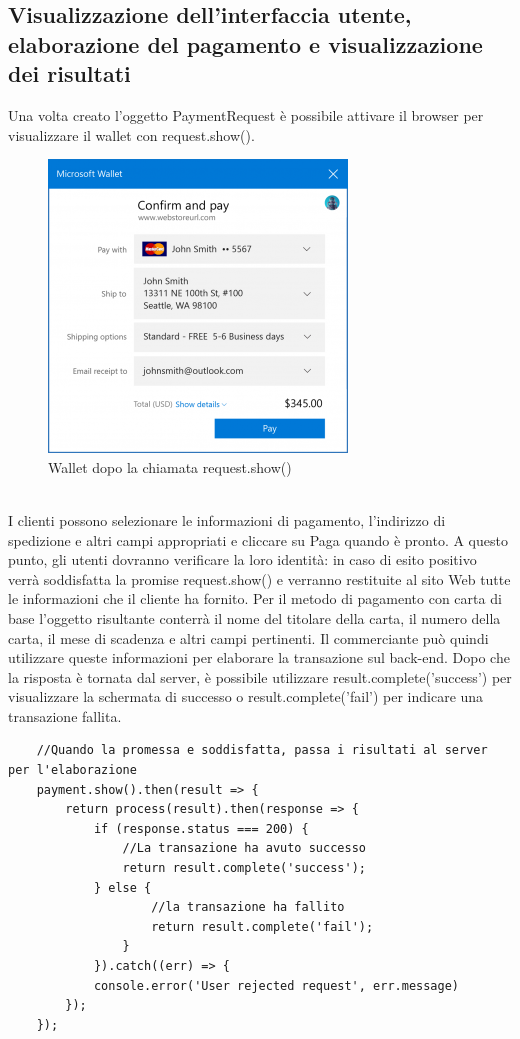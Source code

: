 \documentclass[11pt ,a4paper , twoside , openright ]{article}
\begin{document}
	\subsection{Visualizzazione dell'interfaccia utente, elaborazione del pagamento e visualizzazione dei risultati}
	Una volta creato l'oggetto PaymentRequest è possibile attivare il browser per visualizzare il wallet con request.show(). 
	\begin{figure}[h]
		\centering
		\includegraphics[width=0.5\linewidth]{wallet1}
		\caption{Wallet dopo la chiamata request.show()}
		\label{fig: Wallet dopo la chiamata request.show()}
	\end{figure}
	\\
	I clienti possono  selezionare le informazioni di pagamento, l'indirizzo di spedizione e altri campi appropriati e cliccare su Paga quando è pronto. A questo punto, gli utenti dovranno verificare la loro identità: in caso di esito positivo verrà soddisfatta la promise request.show() e verranno restituite al sito Web tutte le informazioni che il cliente ha fornito. Per il metodo di pagamento con carta di base l'oggetto risultante conterrà il nome del titolare della carta, il numero della carta, il mese di scadenza e altri campi pertinenti. Il commerciante può quindi utilizzare queste informazioni per elaborare la transazione sul back-end.
	Dopo che la risposta è tornata dal server, è possibile utilizzare result.complete('success') per visualizzare la schermata di successo o result.complete('fail') per indicare una transazione fallita.
	\begin{lstlisting}
	//Quando la promessa e soddisfatta, passa i risultati al server per l'elaborazione
	payment.show().then(result => {
		return process(result).then(response => {
			if (response.status === 200) {
				//La transazione ha avuto successo
				return result.complete('success');
			} else {
					//la transazione ha fallito
					return result.complete('fail');
				}
			}).catch((err) => {
			console.error('User rejected request', err.message)
		}); 
	});
	\end{lstlisting}
\end{document}
